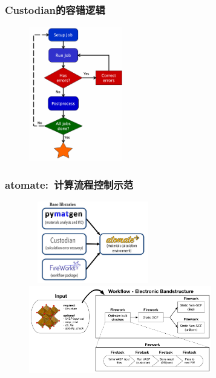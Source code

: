 \frame
{
	\frametitle{\textrm{Custodian}的容错逻辑}
\begin{figure}[h!]
\centering
\vspace*{-0.1in}
\includegraphics[height=2.3in]{Figures/MP_custodian.png}
\label{Custodian_over}
\caption{\fontsize{7.2pt}{4.2pt}}%
\end{figure} 
}

\frame
{
	\frametitle{\textrm{atomate}:~计算流程控制示范}
\begin{figure}[h!]
\centering
\vspace*{-0.19in}
\includegraphics[height=1.4in,width=2.2in,viewport=0 0 820 630,clip]{Figures/Atomate_comp.png}
\vskip 1pt
\includegraphics[height=1.5in]{Figures/bandstructure_wf.png}
\label{Logo_QM-MM}
\end{figure} 
}

